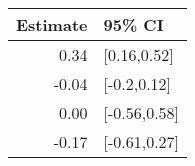 \begin{tabular}{rl}
  \hline
Estimate & 95\% CI \\ 
  \hline
0.34 & [0.16,0.52] \\ 
  -0.04 & [-0.2,0.12] \\ 
  0.00 & [-0.56,0.58] \\ 
  -0.17 & [-0.61,0.27] \\ 
   \hline
\end{tabular}

